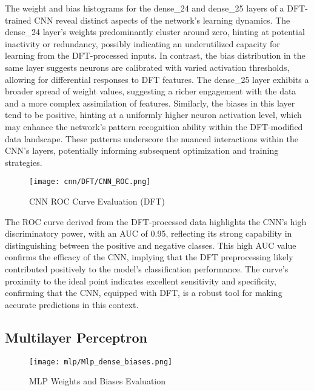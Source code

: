 The weight and bias histograms for the dense\_24 and dense\_25 layers of a DFT-trained CNN reveal distinct aspects of the network's learning dynamics. The dense\_24 layer's weights predominantly cluster around zero, hinting at potential inactivity or redundancy, possibly indicating an underutilized capacity for learning from the DFT-processed inputs. In contrast, the bias distribution in the same layer suggests neurons are calibrated with varied activation thresholds, allowing for differential responses to DFT features. The dense\_25 layer exhibits a broader spread of weight values, suggesting a richer engagement with the data and a more complex assimilation of features. Similarly, the biases in this layer tend to be positive, hinting at a uniformly higher neuron activation level, which may enhance the network's pattern recognition ability within the DFT-modified data landscape. These patterns underscore the nuanced interactions within the CNN's layers, potentially informing subsequent optimization and training strategies.

\begin{figure}[H] 
  \centering
  \texttt{[image: cnn/DFT/CNN\_ROC.png]}
  \caption{CNN ROC Curve Evaluation (DFT)}\label{fig:cnn_roc_curve_dft}
\end{figure}

The ROC curve derived from the DFT-processed data highlights the CNN's high discriminatory power, with an AUC of 0.95, reflecting its strong capability in distinguishing between the positive and negative classes. This high AUC value confirms the efficacy of the CNN, implying that the DFT preprocessing likely contributed positively to the model's classification performance. The curve's proximity to the ideal point indicates excellent sensitivity and specificity, confirming that the CNN, equipped with DFT, is a robust tool for making accurate predictions in this context.



\subsection{Multilayer Perceptron}\label{mlp_visual}

\begin{figure}[H] 
  \centering
  \texttt{[image: mlp/Mlp\_dense\_biases.png]}
  \caption{MLP Weights and Biases Evaluation}\label{fig:mlp_weights_biases}
\end{figure}

